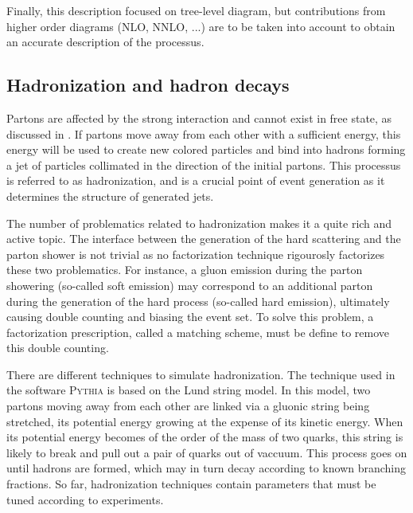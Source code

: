             Finally, this description focused on tree-level diagram, but contributions from
            higher order diagrams (NLO, NNLO, ...) are to be taken into account to obtain
            an accurate description of the processus.

            \subsection{Hadronization and hadron decays}

            Partons are affected by the strong interaction and cannot exist in free state, as discussed in
            . If partons move away from each other
            with a sufficient energy, this energy will be used to create new colored
            particles and bind into hadrons forming a jet of particles collimated in the
            direction of the initial partons. This processus is referred to as hadronization,
            and is a crucial point of event generation as it determines the structure
            of generated jets.

            The number of problematics related to hadronization makes it a quite rich and
            active topic. The interface between the generation of the hard scattering
            and the parton shower is not trivial as no factorization technique rigourosly
            factorizes these two problematics. For instance, a gluon emission during
            the parton showering (so-called soft emission) may correspond to an additional
            parton during the generation of the hard process (so-called hard emission),
            ultimately causing double counting and biasing the event set. To solve this
            problem, a factorization prescription, called a matching scheme, must be define
            to remove this double counting.

            There are different techniques to simulate hadronization. The
            technique used in the software \textsc{Pythia} is based on the Lund string
            model. In this model, two partons moving away from each other are linked
            via a gluonic string being stretched, its potential energy growing at
            the expense of its kinetic energy. When its potential energy becomes of the
            order of the mass of two quarks, this string is likely to break and pull
            out a pair of quarks out of vaccuum. This process goes on until
            hadrons are formed, which may in turn decay according to known branching
            fractions. So far, hadronization techniques contain parameters that must
            be tuned according to experiments.

